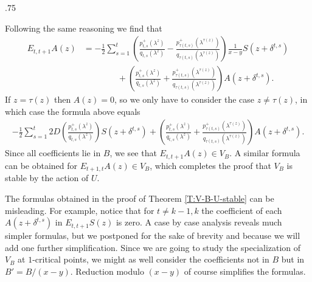 \documentclass[11pt,fleqn]{article}
\makeatletter
\renewenvironment{proof}[1][\textit{Proof}]{\par
  \pushQED{\qed}%
  \normalfont \topsep.75\paraskip\relax
  \trivlist
  \item[\hskip\labelsep
        \itshape
    #1\@addpunct{.}]\ignorespaces
}{%
  \popQED\endtrivlist\@endpefalse
}
\makeatother
\begin{document}
\begin{proof}
Following the same reasoning we find that 
\begin{align*}
E_{t,t+1} A(z)
	&= - \frac{1}{2} \sum_{s=1}^t 
		\left(
			\frac{p_{t,s}^+(\lambda^z)}{q_{t,s}(\lambda^z)} - 
			\frac{p_{\tau(t,s)}^+(\lambda^{\tau(z)})}
				{q_{\tau(t,s)}(\lambda^{\tau(z)})}
		\right) \frac{1}{x-y} S(z + \delta^{t,s}) \\
	&\qquad \qquad + \left( 
		\frac{p_{t,s}^+(\lambda^z)}{q_{t,s}(\lambda^z)} + 
		\frac{p_{\tau(t,s)}^+(\lambda^{\tau(z)})}
			{q_{\tau(t,s)}(\lambda^{\tau(z)})}
	\right) A(z+\delta^{t,s}).
\end{align*}
If $z = \tau(z)$ then $A(z) = 0$, so we only have to consider the case
$z \neq \tau(z)$, in which case the formula above equals
\begin{align*}
- \frac{1}{2} \sum_{s=1}^t 
	2D\left(
		\frac{p_{t,s}^+(\lambda^z)}{q_{t,s}(\lambda^z)}
	\right) S(z + \delta^{t,s}) + \left( 
		\frac{p_{t,s}^+(\lambda^z)}{q_{t,s}(\lambda^z)} + 
		\frac{p_{\tau(t,s)}^+(\lambda^{\tau(z)})}
			{q_{\tau(t,s)}(\lambda^{\tau(z)})}
	\right) A(z+\delta^{t,s}). 
\end{align*}
Since all coefficients lie in $B$, we see that $E_{t,t+1} A(z) \in V_B$.
A similar formula can be obtained for $E_{t+1,t} A(z) \in V_B$, which completes
the proof that $V_B$ is stable by the action of $U$.
\end{proof}

The formulas obtained in the proof of Theorem \ref{T:V-B-U-stable} can be misleading. 
For example, notice that for $t \neq k-1,k$ the coefficient of each $A(z + 
\delta^{t,s})$ in $E_{t,t+1} S(z)$ is zero. A case by case analysis reveals 
much simpler formulas, but we postponed for the sake of brevity and because 
we will add one further simplification. Since we are going to study the 
specialization of $V_B$ at $1$-critical points, we might as well consider the 
coefficients not in $B$ but in $B' = B/(x-y)$. Reduction modulo $(x-y)$ of
course simplifies the formulas. 
\end{document}
